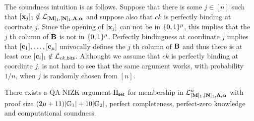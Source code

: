 The soundness intuition is as follows. Suppose that there is some $j\in[n]$ such that $[\mathbf{x}_j]_1\notin{\mathcal{L}_{[\mathbf{{M}}]_1,[\mathbf{{N}}]_1,\mathbf{{\Lambda}},{\boldsymbol \alpha}}}$ and suppose also that $ck$ is perfectly binding at coorinate $j$. Since the opening of $[\mathbf{x}_j]$ can not be in $\{0,1\}^{\mu}$, this implies that the $j$ th column of $\mathbf{{B}}$ is not in $\{0,1\}^{\mu}$. Perfectly bindingness at coordinate $j$ implies that $[\mathbf{c}_1],\ldots,[\mathbf{c}_{\mu}]$ univocally defines the $j$ th column of $\mathbf{{B}}$ and thus there is at least one $[\mathbf{c}_i]_1\notin\mathcal{L}_{ck,\mathsf{bits}}$. Althought we assume that $ck$ is perfectly binding at coordinte $j$, is not hard to see that the same argument works, with probability $1/n$, when $j$ is randomly chosen from $[n]$. 
 \begin{theorem} \label{theo:aggset} There exists a QA-NIZK argument $\Pi_{\mathsf{set}}$ for membership in $\mathcal{L}_{[\mathbf{{M}}]_1,[\mathbf{{N}}]_1,\mathbf{{\Lambda}},{\boldsymbol \alpha}}^n$ with proof size  $(2{\mu}+11)|\mathbb{G}_1|+10|\mathbb{G}_2|$, perfect completeness, perfect-zero knowledge and computational soundness. 
\end{theorem}









